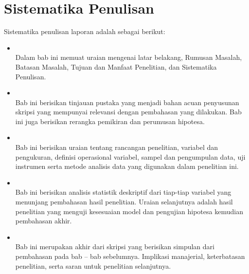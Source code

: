 \section{Sistematika Penulisan}
Sistematika penulisan laporan adalah sebagai berikut:
\begin{itemize}
	\item {} \\
	Dalam bab ini memuat uraian mengenai latar belakang, Rumusan Masalah, Batasan Masalah, Tujuan dan Manfaat Penelitian, dan Sistematika Penulisan. 
	
	\item {} \\
	Bab ini berisikan tinjauan pustaka yang menjadi bahan acuan penyusunan skripsi yang mempunyai relevansi dengan pembahasan yang dilakukan. Bab ini juga berisikan rerangka pemikiran dan perumusan hipotesa. 
	
	\item {} \\ 
	Bab ini berisikan uraian tentang rancangan penelitian, variabel dan pengukuran, definisi operasional variabel, sampel dan pengumpulan data, uji instrumen serta metode analisis data yang digunakan dalam penelitian ini.
	
	\item {} \\
	Bab ini berisikan analisis statistik deskriptif dari tiap-tiap variabel yang menunjang pembahasan hasil penelitian. Uraian selanjutnya adalah hasil penelitian yang menguji kesesuaian model dan pengujian hipotesa kemudian pembahasan akhir.
	
	\item {} \\ 
	Bab ini merupakan akhir dari skripsi yang berisikan simpulan dari pembahasan pada bab – bab sebelumnya. Implikasi manajerial, keterbatasan penelitian, serta saran untuk penelitian selanjutnya. 
\end{itemize} 

